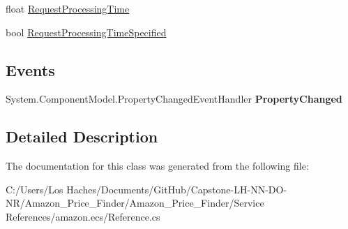 \begin{DoxyCompactItemize}
\begin{DoxyCompactList}\small\item\em \end{DoxyCompactList}\item 
\hypertarget{class_amazon___price___finder_1_1amazon_1_1ecs_1_1_operation_request_aff52ee49f34575f2355b0243c164c6c2}{float \hyperlink{class_amazon___price___finder_1_1amazon_1_1ecs_1_1_operation_request_aff52ee49f34575f2355b0243c164c6c2}{Request\-Processing\-Time}}\label{class_amazon___price___finder_1_1amazon_1_1ecs_1_1_operation_request_aff52ee49f34575f2355b0243c164c6c2}

\begin{DoxyCompactList}\small\item\em \end{DoxyCompactList}\item 
\hypertarget{class_amazon___price___finder_1_1amazon_1_1ecs_1_1_operation_request_aacb3380a0c0a9168d7297622c7c0feb3}{bool \hyperlink{class_amazon___price___finder_1_1amazon_1_1ecs_1_1_operation_request_aacb3380a0c0a9168d7297622c7c0feb3}{Request\-Processing\-Time\-Specified}}\label{class_amazon___price___finder_1_1amazon_1_1ecs_1_1_operation_request_aacb3380a0c0a9168d7297622c7c0feb3}

\begin{DoxyCompactList}\small\item\em \end{DoxyCompactList}\end{DoxyCompactItemize}
\subsection*{Events}
\begin{DoxyCompactItemize}
\item 
\hypertarget{class_amazon___price___finder_1_1amazon_1_1ecs_1_1_operation_request_ae1fe7d5ba970ac3b7b644249c0e7399e}{System.\-Component\-Model.\-Property\-Changed\-Event\-Handler {\bfseries Property\-Changed}}\label{class_amazon___price___finder_1_1amazon_1_1ecs_1_1_operation_request_ae1fe7d5ba970ac3b7b644249c0e7399e}

\end{DoxyCompactItemize}


\subsection{Detailed Description}


The documentation for this class was generated from the following file\-:\begin{DoxyCompactItemize}
\item 
C\-:/\-Users/\-Los Haches/\-Documents/\-Git\-Hub/\-Capstone-\/\-L\-H-\/\-N\-N-\/\-D\-O-\/\-N\-R/\-Amazon\-\_\-\-Price\-\_\-\-Finder/\-Amazon\-\_\-\-Price\-\_\-\-Finder/\-Service References/amazon.\-ecs/Reference.\-cs\end{DoxyCompactItemize}
